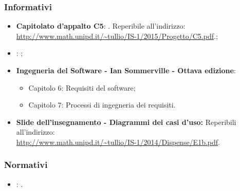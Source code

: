 \subsubsection{Informativi}
\begin{itemize}
\item
\textbf{Capitolato d'appalto C5}: \progetto. Reperibile all'indirizzo: \\
\url{http://www.math.unipd.it/~tullio/IS-1/2015/Progetto/C5.pdf}.;
\item
\textbf{\SdF}: \textit{\SdF};
\item
\textbf{Ingegneria del Software - Ian Sommerville - Ottava edizione}:
	\begin{itemize}
		\item Capitolo 6: Requisiti del software;
		\item Capitolo 7: Processi di ingegneria dei requisiti.
	\end{itemize} 
\item
\textbf{Slide dell’insegnamento - Diagrammi dei casi d’uso:}  Reperibili all'indirizzo: \\ \url{http://www.math.unipd.it/~tullio/IS-1/2014/Dispense/E1b.pdf}.
\end{itemize}

\subsubsection{Normativi}
\begin{itemize}
\item
\textbf{\NdP}: \textit{\NdP}. 
\end{itemize}